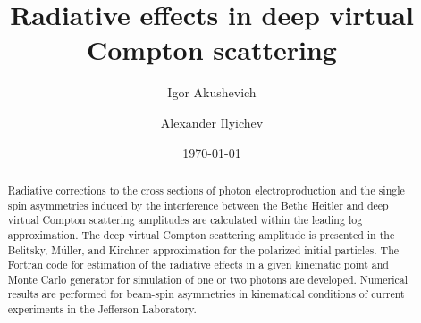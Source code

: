 \documentclass[aps,prd,reprint,groupedaddress,preprintnumbers,showpacs]{revtex4-1}
\begin{document}

\title{Radiative effects in deep virtual Compton scattering}


\author{Igor Akushevich}
\author{Alexander Ilyichev}

\date{\today}

\begin{abstract}
 Radiative corrections to the cross sections of photon electroproduction and the single spin asymmetries induced 
 by the interference between the Bethe Heitler and deep virtual Compton scattering amplitudes 
 are calculated within the leading log approximation. The deep virtual Compton scattering amplitude is 
presented in the Belitsky, M\"uller, and Kirchner approximation for the polarized initial particles. The Fortran code for estimation of the radiative effects in a given kinematic point and Monte Carlo generator for simulation of one or two photons are developed. 
Numerical results are performed for beam-spin asymmetries in kinematical conditions of current experiments in the Jefferson Laboratory.
\end{abstract}
\end{document}
